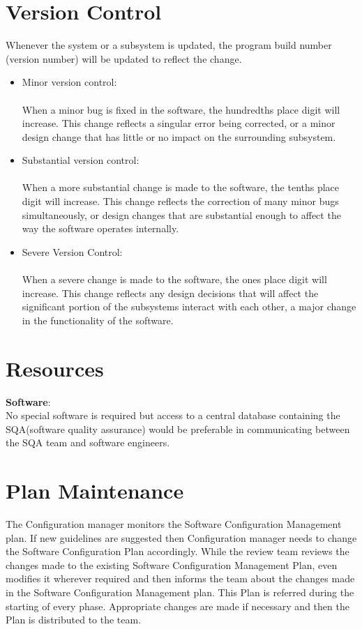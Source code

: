 \documentclass[12pt]{article}
\begin{document}
\section{Version Control}
Whenever the system or a subsystem is updated, the program build number (version number) will be updated to reflect the change.\\ 
\begin{itemize}
    \item Minor version control: \\ \\ When a minor bug is fixed in the software, the hundredths place digit will increase. This change reflects a singular error being corrected, or a minor design change that has little or no impact on the surrounding subsystem.
    \item Substantial version control: \\ \\ When a more substantial change is made to the software, the tenths place digit will increase. This change reflects the correction of many minor bugs simultaneously, or design changes that are substantial enough to affect the way the software operates internally.
    \item Severe Version Control: \\ \\ When a severe change is made to the software, the ones place digit will increase. This change reflects any design decisions that will affect the significant portion of the subsystems interact with each other, a major change in the functionality of the software.
\end{itemize}

\section{Resources}
\textbf{Software}:\\
No special software is required but access to a central database containing the SQA(software quality assurance) would be preferable in communicating between the SQA team and software engineers.

\section{Plan Maintenance}
The Configuration manager monitors the Software Configuration Management plan. If new guidelines are suggested then Configuration manager needs to change the Software Configuration Plan accordingly. While the review team reviews the changes made to the existing Software Configuration Management Plan, even modifies it wherever required and then informs the team about the changes made in the Software Configuration Management plan. This Plan is referred during the starting of every phase. Appropriate changes are made if necessary and then the Plan is distributed to the team.
\end{document}
